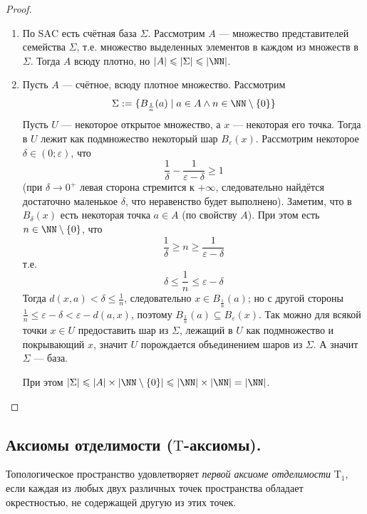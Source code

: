 \documentclass[12pt,a4paper]{article}
\newcommand{\SAC}{\ensuremath{\mathrm{SAC}}\xspace}
\newcommand{\T}{\ensuremath{\mathrm{T}}\xspace}
\begin{document}
    \begin{proof}\ 
        \begin{enumerate}
            \item По \SAC есть счётная база $\Sigma$. Рассмотрим $A$ --- множество представителей семейства $\Sigma$, т.е. множество выделенных элементов в каждом из множеств в $\Sigma$. Тогда $A$ всюду плотно, но $|A| \leqslant |\Sigma| \leqslant |\NN|$.

            \item Пусть $A$ --- счётное, всюду плотное множество. Рассмотрим
                \[\Sigma := \{B_{\frac{1}{n}}(a) \mid a \in A \wedge n \in \NN \setminus \{0\}\}\]
                Пусть $U$ --- некоторое открытое множество, а $x$ --- некоторая его точка. Тогда в $U$ лежит как подмножество некоторый шар $B_\varepsilon(x)$. Рассмотрим некоторое $\delta \in (0; \varepsilon)$, что
                \[\frac{1}{\delta} - \frac{1}{\varepsilon - \delta} \geqslant 1\]
                (при $\delta \to 0^+$ левая сторона стремится к $+\infty$, следовательно найдётся достаточно маленькое $\delta$, что неравенство будет выполнено). Заметим, что в $B_\delta(x)$ есть некоторая точка $a \in A$ (по свойству $A$). При этом есть $n \in \NN \setminus \{0\}$, что
                \[\frac{1}{\delta} \geqslant n \geqslant \frac{1}{\varepsilon - \delta}\]
                т.е.
                \[\delta \leqslant \frac{1}{n} \leqslant \varepsilon - \delta\]
                Тогда $d(x, a) < \delta \leqslant \frac{1}{n}$, следовательно $x \in B_{\frac{1}{n}}(a)$; но с другой стороны $\frac{1}{n} \leqslant \varepsilon - \delta < \varepsilon - d(a, x)$, поэтому $B_\frac{1}{n}(a) \subseteq B_\varepsilon(x)$. Так можно для всякой точки $x \in U$ предоставить шар из $\Sigma$, лежащий в $U$ как подмножество и покрывающий $x$, значит $U$ порождается объединением шаров из $\Sigma$. А значит $\Sigma$ --- база.

                При этом $|\Sigma| \leqslant |A| \times |\NN \setminus \{0\}| \leqslant |\NN| \times |\NN| = |\NN|$.
        \end{enumerate}
    \end{proof}

    \subsection{Аксиомы отделимости (\T-аксиомы).}

    \begin{definition}
        Топологическое пространство удовлетворяет \emph{первой аксиоме отделимости} $\T_1$, если каждая из любых двух различных точек пространства обладает окрестностью, не содержащей другую из этих точек.
    \end{definition}
\end{document}

